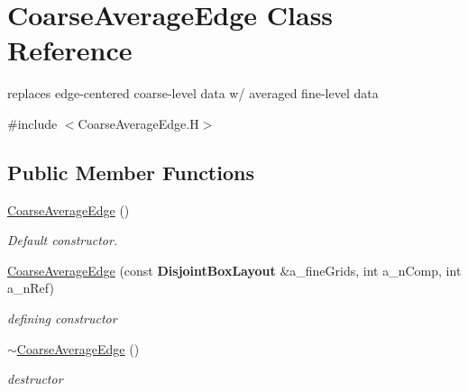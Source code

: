 \hypertarget{class_coarse_average_edge}{}\section{Coarse\+Average\+Edge Class Reference}
\label{class_coarse_average_edge}


replaces edge-\/centered coarse-\/level data w/ averaged fine-\/level data  




{\ttfamily \#include $<$Coarse\+Average\+Edge.\+H$>$}

\subsection*{Public Member Functions}
\begin{DoxyCompactItemize}
\item 
\mbox{\label{class_coarse_average_edge_ab19f8a588cdb3b2ecaacd58e0340aa6d}} 
\hyperlink{class_coarse_average_edge_ab19f8a588cdb3b2ecaacd58e0340aa6d}{Coarse\+Average\+Edge} ()
\begin{DoxyCompactList}\small\item\em Default constructor. \end{DoxyCompactList}\item 
\mbox{\label{class_coarse_average_edge_a587bc75ddb480a189e5e619a3b23dc62}} 
\hyperlink{class_coarse_average_edge_a587bc75ddb480a189e5e619a3b23dc62}{Coarse\+Average\+Edge} (const \textbf{ Disjoint\+Box\+Layout} \&a\+\_\+fine\+Grids, int a\+\_\+n\+Comp, int a\+\_\+n\+Ref)
\begin{DoxyCompactList}\small\item\em defining constructor \end{DoxyCompactList}\item 
\mbox{\label{class_coarse_average_edge_a9f9f40f39d1de2bee0f060e8a1829df6}} 
\hyperlink{class_coarse_average_edge_a9f9f40f39d1de2bee0f060e8a1829df6}{$\sim$\+Coarse\+Average\+Edge} ()
\begin{DoxyCompactList}\small\item\em destructor \end{DoxyCompactList}\item 
\mbox{\label{class_coarse_average_edge_afd652746f2915f00ed0b2aaad8888f4f}} 

\end{DoxyCompactItemize}
